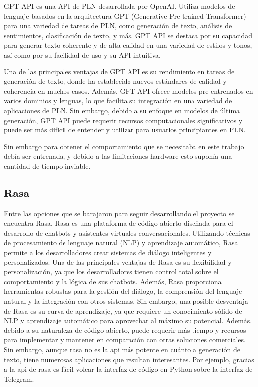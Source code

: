 GPT API es una API de PLN desarrollada por OpenAI. Utiliza modelos de lenguaje basados en la arquitectura GPT (Generative Pre-trained Transformer) para una variedad de tareas de PLN, como generación de texto, análisis de sentimientos, clasificación de texto, y más. GPT API se destaca por su capacidad para generar texto coherente y de alta calidad en una variedad de estilos y tonos, así como por su facilidad de uso y su API intuitiva.

Una de las principales ventajas de GPT API es su rendimiento en tareas de generación de texto, donde ha establecido nuevos estándares de calidad y coherencia en muchos casos. Además, GPT API ofrece modelos pre-entrenados en varios dominios y lenguas, lo que facilita su integración en una variedad de aplicaciones de PLN. Sin embargo, debido a su enfoque en modelos de última generación, GPT API puede requerir recursos computacionales significativos y puede ser más difícil de entender y utilizar para usuarios principiantes en PLN.

Sin embargo para obtener el comportamiento que se necesitaba en este trabajo debía ser entrenada, y debido a las limitaciones hardware esto suponía una cantidad de tiempo inviable. 

\subsection{Rasa}
Entre las opciones que se barajaron para seguir desarrollando el proyecto se encuentra Rasa. Rasa es una plataforma de código abierto diseñada para el desarrollo de chatbots y asistentes virtuales conversacionales. Utilizando técnicas de procesamiento de lenguaje natural (NLP) y aprendizaje automático, Rasa permite a los desarrolladores crear sistemas de diálogo inteligentes y personalizados. Una de las principales ventajas de Rasa es su flexibilidad y personalización, ya que los desarrolladores tienen control total sobre el comportamiento y la lógica de sus chatbots. Además, Rasa proporciona herramientas robustas para la gestión del diálogo, la comprensión del lenguaje natural y la integración con otros sistemas. Sin embargo, una posible desventaja de Rasa es su curva de aprendizaje, ya que requiere un conocimiento sólido de NLP y aprendizaje automático para aprovechar al máximo su potencial. Además, debido a su naturaleza de código abierto, puede requerir más tiempo y recursos para implementar y mantener en comparación con otras soluciones comerciales. Sin embargo, aunque rasa no es la api más potente en cuánto a generación de texto, tiene numerosas aplicaciones que resultan interesantes. Por ejemplo, gracias a la api de rasa es fácil volcar la interfaz de código en Python sobre la interfaz de Telegram. 

